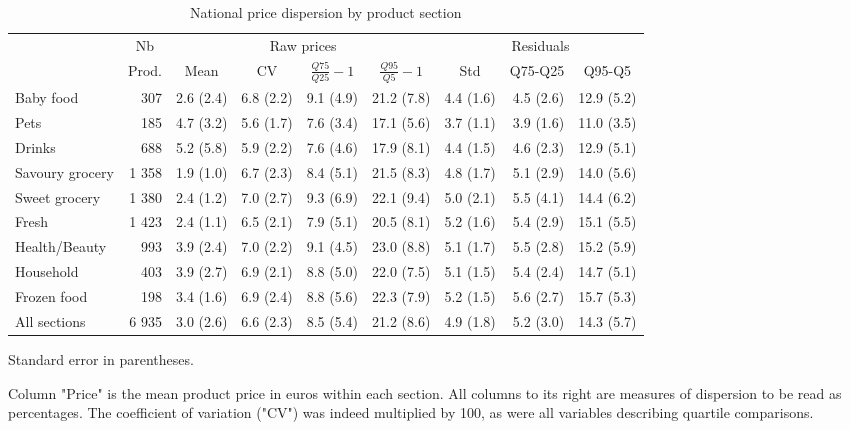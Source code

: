\documentclass[english]{article}
\begin{document}
\begin{table}
\begin{threeparttable}
\caption{National price dispersion by product section}
\label{tab:stats_nat_dispersion}
\small
\begin{tabular}{lr|rrrr|rrr}
    \toprule
    \toprule
          & \multicolumn{1}{c|}{Nb} & \multicolumn{4}{c|}{Raw prices} & \multicolumn{3}{c}{Residuals} \\
          & \multicolumn{1}{c|}{Prod.} & \multicolumn{1}{c}{Mean} & \multicolumn{1}{c}{CV} & \multicolumn{1}{c}{$\frac{Q75}{Q25}-1$} & \multicolumn{1}{c|}{$\frac{Q95}{Q5}-1$} & \multicolumn{1}{c}{Std} & \multicolumn{1}{c}{Q75-Q25} & \multicolumn{1}{c}{Q95-Q5} \\
    \midrule
    Baby food &  307  & 2.6 (2.4) & 6.8 (2.2) & 9.1 (4.9) & 21.2 (7.8) & 4.4 (1.6) & 4.5 (2.6) & 12.9 (5.2) \\
    Pets  &  185  & 4.7 (3.2) & 5.6 (1.7) & 7.6 (3.4) & 17.1 (5.6) & 3.7 (1.1) & 3.9 (1.6) & 11.0 (3.5) \\
    Drinks &  688  & 5.2 (5.8) & 5.9 (2.2) & 7.6 (4.6) & 17.9 (8.1) & 4.4 (1.5) & 4.6 (2.3) & 12.9 (5.1) \\
    Savoury grocery & 1 358 & 1.9 (1.0) & 6.7 (2.3) & 8.4 (5.1) & 21.5 (8.3) & 4.8 (1.7) & 5.1 (2.9) & 14.0 (5.6) \\
    Sweet grocery & 1 380 & 2.4 (1.2) & 7.0 (2.7) & 9.3 (6.9) & 22.1 (9.4) & 5.0 (2.1) & 5.5 (4.1) & 14.4 (6.2) \\
    Fresh & 1 423 & 2.4 (1.1) & 6.5 (2.1) & 7.9 (5.1) & 20.5 (8.1) & 5.2 (1.6) & 5.4 (2.9) & 15.1 (5.5) \\
    Health/Beauty &  993  & 3.9 (2.4) & 7.0 (2.2) & 9.1 (4.5) & 23.0 (8.8) & 5.1 (1.7) & 5.5 (2.8) & 15.2 (5.9) \\
    Household &  403  & 3.9 (2.7) & 6.9 (2.1) & 8.8 (5.0) & 22.0 (7.5) & 5.1 (1.5) & 5.4 (2.4) & 14.7 (5.1) \\
    Frozen food &  198  & 3.4 (1.6) & 6.9 (2.4) & 8.8 (5.6) & 22.3 (7.9) & 5.2 (1.5) & 5.6 (2.7) & 15.7 (5.3) \\
    \midrule
    All sections & 6 935 & 3.0 (2.6) & 6.6 (2.3) & 8.5 (5.4) & 21.2 (8.6) & 4.9 (1.8) & 5.2 (3.0) & 14.3 (5.7) \\
    \bottomrule
    \bottomrule
\end{tabular}
\begin{tablenotes}
      \small
			\item Standard error in parentheses.
      \item Column "Price" is the mean product price in euros within each section. All columns to its right are measures of dispersion to be read as percentages. The coefficient of variation ("CV") was indeed multiplied by 100, as were all variables describing quartile comparisons.
\end{tablenotes}
\end{threeparttable}
\end{table}
\end{document}
